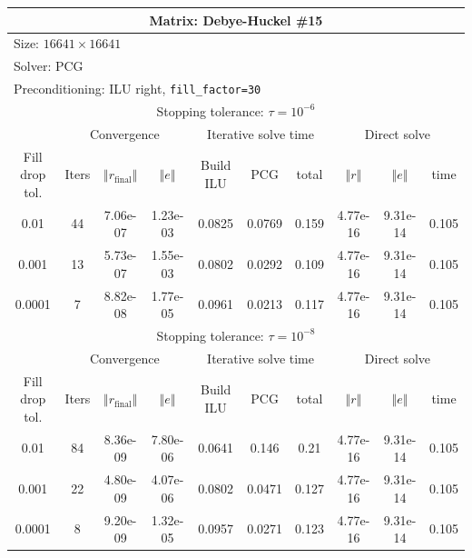 \documentclass[oneside,final]{amsart}  %
\begin{document}
\begin{tabular}{|c|c|c|c|c|c|c|c|c|c|}
\hline
\multicolumn{10}{|c|}{Matrix: Debye-Huckel \#15}\tabularnewline
\hline
  \multicolumn{10}{|l|}{Size: $16641\times16641$}\tabularnewline
\hline
\multicolumn{10}{|l|}{Solver: PCG}\tabularnewline
\hline
\multicolumn{10}{|l|}{Preconditioning: ILU right, \texttt{fill\_factor=30}}\tabularnewline
\hline
\hline
\multicolumn{10}{|c|}{Stopping tolerance: $\tau=10^{-6}$}\tabularnewline
\hline
\hline
 & \multicolumn{3}{c|}{Convergence} & \multicolumn{3}{c|}{Iterative solve time} & \multicolumn{3}{c|}{Direct solve}\tabularnewline
\hline
Fill drop tol.  & Iters & $\left\Vert r_{\text{final}}\right\Vert $  & $\left\Vert e\right\Vert $  & Build ILU  & PCG  & total  & $\left\Vert r\right\Vert $ & $\left\Vert e\right\Vert $  & time\tabularnewline
\hline
  0.01 & 44 & 7.06e-07 & 1.23e-03 &     0.0825 &     0.0769 &      0.159 & 4.77e-16 & 9.31e-14 &      0.105\\
  \hline
  0.001 & 13 & 5.73e-07 & 1.55e-03 &     0.0802 &     0.0292 &      0.109 & 4.77e-16 & 9.31e-14 &      0.105\\
  \hline
  0.0001 & 7 & 8.82e-08 & 1.77e-05 &     0.0961 &     0.0213 &      0.117 & 4.77e-16 & 9.31e-14 &      0.105\\
  \hline
\hline
\multicolumn{10}{|c|}{Stopping tolerance: $\tau=10^{-8}$}\tabularnewline
\hline
\hline
 & \multicolumn{3}{c|}{Convergence} & \multicolumn{3}{c|}{Iterative solve time} & \multicolumn{3}{c|}{Direct solve }\tabularnewline
\hline
Fill drop tol.  & Iters  & $\left\Vert r_{\text{final}}\right\Vert $  & $\left\Vert e\right\Vert $ & Build ILU  & PCG  & total  & $\left\Vert r\right\Vert $  & $\left\Vert e\right\Vert $  & time\tabularnewline
\hline
  0.01 & 84 & 8.36e-09 & 7.80e-06 &     0.0641 &      0.146 &       0.21 & 4.77e-16 & 9.31e-14 &      0.105\\
  \hline
  0.001 & 22 & 4.80e-09 & 4.07e-06 &     0.0802 &     0.0471 &      0.127 & 4.77e-16 & 9.31e-14 &      0.105\\
  \hline
  0.0001 & 8 & 9.20e-09 & 1.32e-05 &     0.0957 &     0.0271 &      0.123 & 4.77e-16 & 9.31e-14 &      0.105\\
  \hline
\end{tabular}
\end{document}
